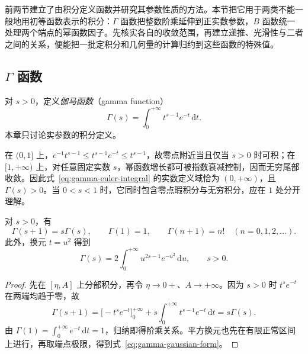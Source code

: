 前两节建立了由积分定义函数并研究其参数性质的方法。本节把它用于两类不能一般地用初等函数表示的积分：$\Gamma$ 函数把整数阶乘延伸到正实数参数，$B$ 函数统一处理两个端点的幂函数因子。先核实各自的收敛范围，再建立递推、光滑性与二者之间的关系，便能把一批定积分和几何量的计算归约到这些函数的特殊值。

\subsection{\texorpdfstring{$\Gamma$}{Gamma} 函数}
\label{subsec:gamma-function}

\begin{definition}[伽马函数]
\label{def:gamma-euler-integral}
对 $s>0$，定义\emph{伽马函数}（gamma function）
\begin{equation}
    \Gamma(s)=\int_0^{+\infty}t^{s-1}e^{-t}\,\mathrm{d}t.
    \label{eq:gamma-euler-integral}
\end{equation}
本章只讨论实参数的积分定义。
\end{definition}

在 $(0,1]$ 上，$e^{-1}t^{s-1}\leq t^{s-1}e^{-t}\leq t^{s-1}$，故零点附近当且仅当 $s>0$ 时可积；在 $[1,+\infty)$ 上，对任意固定实数 $s$，幂函数增长都可被指数衰减控制，因而无穷尾部收敛。因此式~\eqref{eq:gamma-euler-integral} 的实数定义域恰为 $(0,+\infty)$，且 $\Gamma(s)>0$。当 $0<s<1$ 时，它同时包含零点瑕积分与无穷积分，应在 $1$ 处分开理解。

\begin{proposition}[递推公式与阶乘]
\label{prop:gamma-recurrence-factorials}
对 $s>0$，有
\begin{equation}
    \Gamma(s+1)=s\Gamma(s),\qquad
    \Gamma(1)=1,\qquad \Gamma(n+1)=n!\quad(n=0,1,2,\ldots).
    \label{eq:gamma-recurrence-factorials}
\end{equation}
此外，换元 $t=u^2$ 得到
\begin{equation}
    \Gamma(s)=2\int_0^{+\infty}u^{2s-1}e^{-u^2}\,\mathrm{d}u,
    \qquad s>0.
    \label{eq:gamma-gaussian-form}
\end{equation}
\end{proposition}

\begin{proof}
先在 $[\eta,A]$ 上分部积分，再令 $\eta\to0+$、$A\to+\infty$。因为 $s>0$ 时 $t^se^{-t}$ 在两端均趋于零，故
\[
    \Gamma(s+1)=\bigl[-t^se^{-t}\bigr]_0^{+\infty}
       +s\int_0^{+\infty}t^{s-1}e^{-t}\,\mathrm{d}t
    =s\Gamma(s).
\]
由 $\Gamma(1)=\int_0^{+\infty}e^{-t}\,\mathrm{d}t=1$，归纳即得阶乘关系。平方换元也先在有限正常区间上进行，再取端点极限，得到式~\eqref{eq:gamma-gaussian-form}。
\end{proof}

